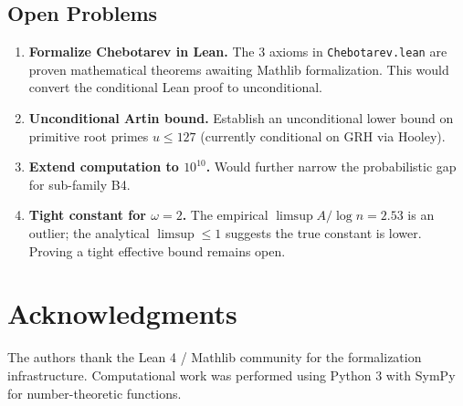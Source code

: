 \documentclass[11pt,a4paper]{article}
\theoremstyle{plain}
\theoremstyle{plain}
\theoremstyle{definition}
\numberwithin{equation}{section}
\begin{document}
\subsection{Open Problems}

\begin{enumerate}
  \item \textbf{Formalize Chebotarev in Lean.} The 3 axioms in \texttt{Chebotarev.lean} are proven mathematical theorems awaiting Mathlib formalization. This would convert the conditional Lean proof to unconditional.
  \item \textbf{Unconditional Artin bound.} Establish an unconditional lower bound on primitive root primes $u \leq 127$ (currently conditional on GRH via Hooley).
  \item \textbf{Extend computation to $10^{10}$.} Would further narrow the probabilistic gap for sub-family B4.
  \item \textbf{Tight constant for $\omega = 2$.} The empirical $\limsup A/\log n = 2.53$ is an outlier; the analytical $\limsup \leq 1$ suggests the true constant is lower. Proving a tight effective bound remains open.
\end{enumerate}

\section*{Acknowledgments}

The authors thank the Lean 4 / Mathlib community for the formalization infrastructure. Computational work was performed using Python 3 with SymPy for number-theoretic functions.
\end{document}
